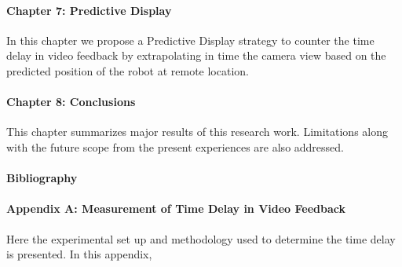 \paragraph*{Chapter 7: Predictive Display \\}
In this chapter we propose a Predictive Display strategy to counter the time delay in video feedback by extrapolating in time  the camera view based on the predicted position of the robot at remote location. 

\paragraph*{Chapter 8: Conclusions\\}
This chapter summarizes major results of this research work. Limitations along with the future scope from the present experiences are also addressed.


\paragraph*{Bibliography}
\paragraph*{Appendix A:  Measurement of Time Delay in Video Feedback  \\}
Here the experimental set up and methodology used to determine the time delay is presented.
In this appendix, 
